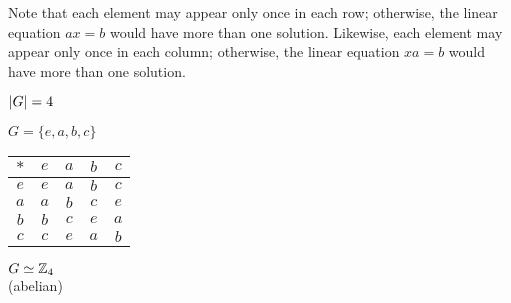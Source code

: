 \documentclass[letterpaper,12pt,fleqn]{article}
\begin{document}
\bigskip

Note that each element may appear only once in each row; otherwise, the linear
equation $ax=b$ would have more than one solution. Likewise, each element may
appear only once in each column; otherwise, the linear equation $xa=b$ would
have more than one solution.

\underline{$\lvert G\rvert=4$}

\bigskip

$G=\{e,a,b,c\}$

\bigskip

\begin{tabular}{c|cccc}
  $*$ & $e$ & $a$ & $b$ & $c$ \\
  \hline
  $e$ & $e$ & $a$ & $b$ & $c$ \\
  $a$ & $a$ & $b$ & $c$ & $e$ \\
  $b$ & $b$ & $c$ & $e$ & $a$ \\
  $c$ & $c$ & $e$ & $a$ & $b$ \\
\end{tabular}

\bigskip

$G\simeq\mathbb{Z}_4$ \\
(abelian)

\bigskip
\end{document}
